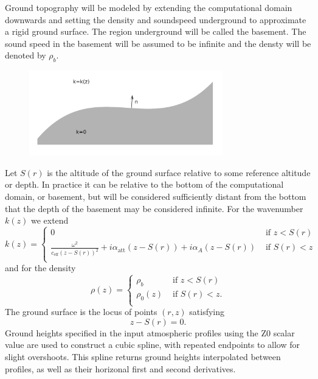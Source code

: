 Ground topography will be modeled by extending the computational domain downwards and setting the density and soundspeed underground to approximate a rigid ground surface. The region underground will be called the basement. The sound speed in the basement will be assumed to be infinite and the densty will be denoted by $\rho_b$. 
\begin{figure}[h]
  \centering
  \includegraphics[width=0.75\textwidth]{figs/topography.pdf}
\end{figure}
Let $S(r)$ is the altitude of the ground surface relative to some reference altitude or depth. In practice it can be relative to the bottom of the computational domain, or basement, but will be considered sufficiently distant from the bottom that the depth of the basement may be considered infinite. For the wavenumber $k(z)$ we extend
\begin{equation}
k(z)=\begin{cases}
0 & \text{   if } z<S(r)\\
\frac{\omega^2}{c_{\text{eff}}(z-S(r))^2}+i\alpha_{\text{att}}(z-S(r))+i\alpha_A(z-S(r)) & \text{   if } S(r)<z\\
\end{cases}
\label{eq:k_def_w_basement}\end{equation}
and for the density
\[
\rho(z) =\begin{cases}
\rho_b & \text{   if } z<S(r)\\
\rho_0(z) & \text{   if } S(r)<z.\\
\end{cases}
\]
The ground surface is the locus of points $(r,z)$ satisfying 
\[
z-S(r)=0.
\]
Ground heights specified in the input atmospheric profiles using the Z0 scalar value are used to construct a cubic spline, with repeated endpoints to allow for slight overshoots. This spline returns ground heights interpolated between profiles, as well as their horizonal first and second derivatives.


